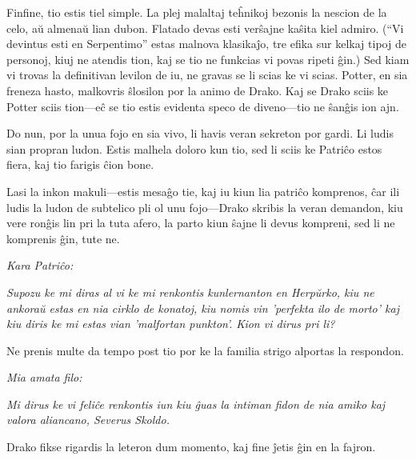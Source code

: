 Finfine, tio estis tiel simple. La plej malaltaj teĥnikoj bezonis la
nescion de la celo, aŭ almenaŭ lian dubon. Flatado devas esti verŝajne
kaŝita kiel admiro. (``Vi devintus esti en Serpentimo'' estas malnova
klasikaĵo, tre efika sur kelkaj tipoj de personoj, kiuj ne atendis
tion, kaj se tio ne funkcias vi povas ripeti ĝin.) Sed kiam vi trovas
la definitivan levilon de iu, ne gravas se li scias ke vi
scias. Potter, en sia freneza hasto, malkovris ŝlosilon por la animo
de Drako. Kaj se Drako sciis ke Potter sciis tion—eĉ se tio estis
evidenta speco de diveno—tio ne ŝanĝis ion ajn.

Do nun, por la unua fojo en sia vivo, li havis veran sekreton
por gardi. Li ludis sian propran ludon. Estis malhela doloro kun
tio, sed li sciis ke Patriĉo estos fiera, kaj tio farigis ĉion bone.

Lasi la inkon makuli—estis mesaĝo tie, kaj iu kiun lia patriĉo
komprenos, ĉar ili ludis la ludon de subtelico pli ol unu fojo—Drako
skribis la veran demandon, kiu vere ronĝis lin pri la tuta afero, la
parto kiun ŝajne li devus kompreni, sed li ne komprenis ĝin, tute ne.

\emph{Kara Patriĉo:}

\emph{Supozu ke mi diras al vi ke mi renkontis kunlernanton en Herpŭrko,
  kiu ne ankoraŭ estas en nia cirklo de konatoj, kiu nomis vin
  'perfekta ilo de morto' kaj kiu diris ke mi estas vian 'malfortan
  punkton'. Kion vi dirus pri li?}

Ne prenis multe da tempo post tio por ke la familia strigo alportas la
respondon.

\emph{Mia amata filo:}

\emph{Mi dirus ke vi feliĉe renkontis iun kiu ĝuas la intiman
  fidon de nia amiko kaj valora aliancano, Severus Skoldo.}

Drako fikse rigardis la leteron dum momento, kaj fine ĵetis ĝin en la
fajron.

